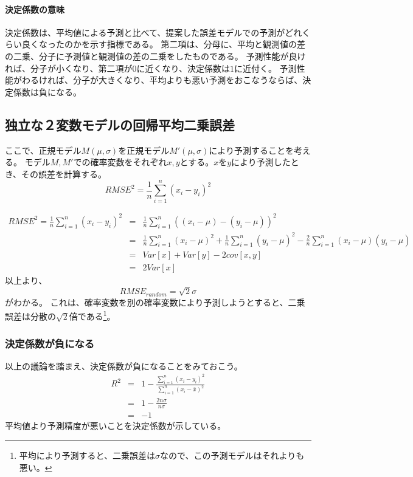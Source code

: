 \paragraph{決定係数の意味}
決定係数は、平均値による予測と比べて、提案した誤差モデルでの予測がどれくらい良くなったのかを示す指標である。
第二項は、分母に、平均と観測値の差の二乗、分子に予測値と観測値の差の二乗をしたものである。
予測性能が良ければ、分子が小くなり、第二項が$0$に近くなり、決定係数は$1$に近付く。
予測性能がわるければ、分子が大きくなり、平均よりも悪い予測をおこなうならば、決定係数は負になる。

\subsection{独立な２変数モデルの回帰平均二乗誤差}
ここで、正規モデル$M(\mu,\sigma)$を正規モデル$M'(\mu,\sigma)$により予測することを考える。
モデル$M,M'$での確率変数をそれぞれ$x,y$とする。$x$を$y$により予測したとき、その誤差を計算する。
\begin{equation*}
 RMSE^2 = \frac{1}{n}\sum_{i=1}^n (x_i-y_i)^2
\end{equation*}

\begin{eqnarray*}
 RMSE^2=\frac{1}{n}\sum_{i=1}^n (x_i-y_i)^2 &=& \frac{1}{n}\sum_{i=1}^n \left( (x_i-\mu)-(y_i-\mu)\right) ^2\\
 &=& \frac{1}{n}\sum_{i=1}^n (x_i-\mu)^2+\frac{1}{n}\sum_{i=1}^n(y_i-\mu)^2-\frac{2}{n}\sum_{i=1}^n(x_i-\mu)(y_i-\mu) \\
 &=& Var[x]+Var[y]-2cov[x,y] \\
 &=& 2Var[x]
\end{eqnarray*}
 以上より、
\begin{equation*}
 RMSE_{random} = \sqrt{2}\sigma
\end{equation*}
がわかる。
これは、確率変数を別の確率変数により予測しようとすると、二乗誤差は分散の$\sqrt{2}$倍である\footnote{平均により予測すると、二乗誤差は$\sigma$なので、この予測モデルはそれよりも悪い。}。

\subsubsection{決定係数が負になる}
以上の議論を踏まえ、決定係数が負になることをみておこう。
\begin{eqnarray*}
 R^2 &=& 1-\frac{\sum_{i=1}^n (x_i-y_i)^2}{\sum_{i=1}^n (x_i-\bar{x})^2}\\
 &=& 1-\frac{2n\sigma}{n\sigma}\\
 &=& -1
\end{eqnarray*}
平均値より予測精度が悪いことを決定係数が示している。


